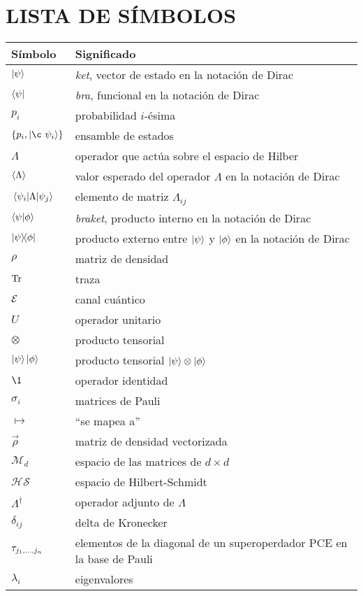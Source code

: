 

\chapter{LISTA DE SÍMBOLOS}

\begin{longtable}{@{}l@{\extracolsep{\fill}} p{4.75in} @{}}  %
  \textsf{Símbolo} & \textsf{Significado}\\[12pt]
  \endhead
  $\ket{\psi}$ &  \textit{ket}, vector de estado en la notación de Dirac \\
  $\bra{\psi}$ & \textit{bra}, funcional en la notación de Dirac\\
  $p_i$ & probabilidad $i$-ésima\\
  $\qty{p_i,\ket{¸\psi_i}}$ & ensamble de estados \\
  $\Lambda$ &  operador que actúa sobre el espacio de Hilber\\
  $\expval{\Lambda}$ & valor esperado del operador $\Lambda$ en la notación de Dirac\\
  $\matrixel{\psi_i}{\Lambda}{\psi_j}$ & elemento de matriz $\Lambda_{ij}$\\
  $\braket{\psi}{\phi}$ & \textit{braket}, producto interno en la notación de Dirac\\
  $\dyad{\psi}{\phi}$ & producto externo entre $\ket{\psi}$ y $\ket{\phi}$ en la notación de Dirac \\
  $\rho$ & matriz de densidad\\
  $\Tr$ & traza \\
	$\mathcal{E}$ & canal cuántico \\
	$U$ & operador unitario \\
	$\otimes$ & producto tensorial\\
	$\ket{\psi}\ket{\phi}$ & producto tensorial $\ket{\psi}\otimes\ket{\phi}$\\
	$\1$ & operador identidad \\
	$\sigma_i$ & matrices de Pauli\\
	$\mapsto$ & ``se mapea a''\\
	$\vec\rho$ & matriz de densidad vectorizada\\
	$\mathcal{M}_d$ & espacio de las matrices de $d\times d$\\
	$\mathcal{HS}$ & espacio de Hilbert-Schmidt\\
	$\Lambda^{\dagger}$ & operador adjunto de $\Lambda$\\
	$\delta_{ij}$ & delta de Kronecker\\
	$\tau_{j_1,\ldots ,j_n}$ & elementos de la diagonal de un superoperdador PCE en la base de Pauli\\
	$\lambda_i$ & eigenvalores
\end{longtable}
